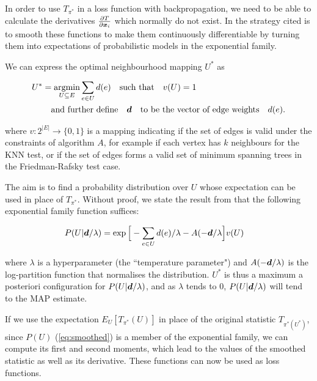 In order to use $T_{\pi^*}$ in a loss function with backpropagation, we need to be able to calculate the derivatives $\frac{\partial T}{\partial \boldsymbol{x}_i}$ which normally do not exist. In \cite{torchtwosample} the strategy cited is to smooth these functions to make them continuously differentiable by turning them into expectations of probabilistic models in the exponential family. 

We can express the optimal neighbourhood mapping $U^*$ as 

\begin{equation}
\begin{split}
U^* &= \underset{U \subseteq E}{\operatorname{argmin}} \sum_{e \in U} d(e) \quad \text{such that} \quad v(U) = 1 \\
&\quad \text{and further define} \quad \boldsymbol{d} \quad \text{to be the vector of edge weights} \quad d(e). 
\end{split}
\end{equation}

where $v: 2^{|E|} \rightarrow \{0, 1 \}$ is a mapping indicating if the set of edges is valid under the constraints of algorithm $A$, for example if each vertex has $k$ neighbours for the KNN test, or if the set of edges forms a valid set of minimum spanning trees in the Friedman-Rafsky test case. 

The aim is to find a probability distribution over $U$ whose expectation can be used in place of $T_{\pi^*}$. Without proof, we state the result from \cite{torchtwosample} that the following exponential family function suffices:

\begin{equation}
\label{eq:smoothed}
\begin{split}
P(U | \boldsymbol{d} / \lambda) &= \exp\Big[-\sum_{e \in U} d(e) / \lambda - A(-\boldsymbol{d} / \lambda \Big] v(U)
\end{split}
\end{equation}

where $\lambda$ is a hyperparameter (the ``temperature parameter") and $A(-\boldsymbol{d} / \lambda)$ is the log-partition function  that normalises the distribution. $U^*$ is thus a maximum a posteriori configuration for $P(U | \boldsymbol{d}/\lambda)$, and as $\lambda$ tends to 0,  $P(U | \boldsymbol{d}/\lambda)$ will tend to the MAP estimate. 

If we use the expectation $E_{U}[T_{\pi^*}(U)]$ in place of the original statistic $T_{\pi^*(U^*)}$, since $P(U)$ (\ref{eq:smoothed}) is a member of the exponential family, we can compute its first and second moments, which lead to the values of the smoothed statistic as well as its derivative. These functions can now be used as loss functions. 


